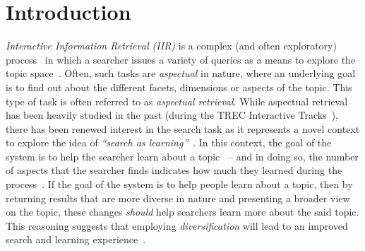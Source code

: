 \section{Introduction} \label{sec:intro}
\emph{Interactive Information Retrieval (IIR)} is a complex (and often exploratory) process~\cite{ingwersen2005theturn} in which a searcher issues a variety of queries as a means to explore the topic space~\cite{kelly2015search_tasks}. Often, such tasks are \emph{aspectual} in nature, where an underlying goal is to find out about the different facets, dimensions or aspects of the topic. This type of task is often referred to as \emph{aspectual retrieval}. While aspectual retrieval has been heavily studied in the past (during the TREC Interactive Tracks~\cite{over2001trec}), there has been renewed interest in the search task as it represents a novel context to explore the idea of \emph{``search as learning''}~\cite{collins2017sal}. In this context, the goal of the system is to help the searcher learn about a topic~\cite{collins2017sal} -- and in doing so, the number of aspects that the searcher finds indicates how much they learned during the process~\cite{syed2017sal}. If the goal of the system is to help people learn about a topic, then by returning results that are more diverse in nature and presenting a broader view on the topic, these changes \emph{should} help searchers learn more about the said topic. This reasoning suggests that employing \emph{diversification} will lead to an improved search and learning experience~\cite{syed2017sal}. 

